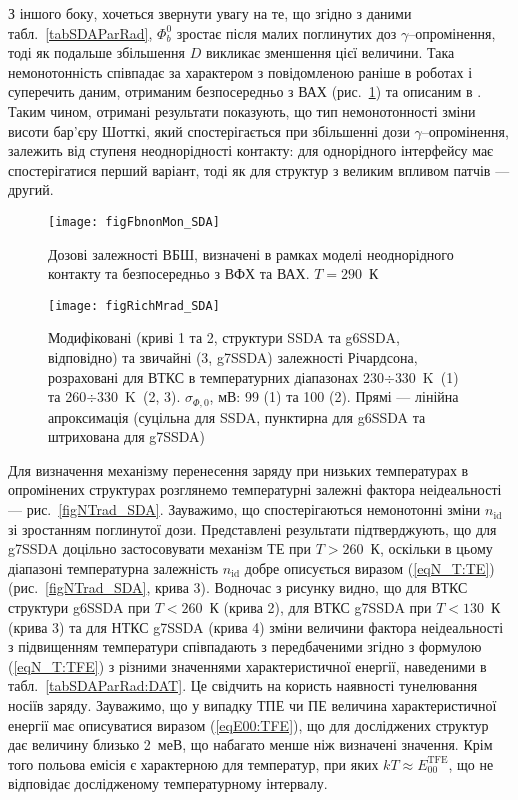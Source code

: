 З іншого боку, хочеться звернути увагу на те, що згідно з даними табл.~\ref{tabSDAParRad},
$\Phi_b^0$ зростає після малих поглинутих доз $\gamma$--опромінення, тоді як подальше збільшення $D$ викликає зменшення
цієї величини.
Така немонотонність співпадає за характером з повідомленою раніше в роботах \cite{Karatas:2006NIMA, Vorobets, Pattabi} і суперечить
даним, отриманим безпосередньо з ВАХ (рис.~\ref{figFbnonMon_SDA})  та описаним в \cite{Umana,Verma}.
Таким чином, отримані результати показують, що тип немонотонності зміни висоти бар'єру Шотткі, який спостерігається
при збільшенні дози $\gamma$--опромінення,
залежить від ступеня неоднорідності контакту:
для однорідного інтерфейсу має спостерігатися перший варіант,
тоді як для структур з великим впливом патчів --- другий.

\begin{figure}
\center
\texttt{[image: figFbnonMon\_SDA]}
\caption{\label{figFbnonMon_SDA}
Дозові залежності ВБШ, визначені в рамках моделі неоднорідного контакту та безпосередньо з ВФХ та ВАХ.
$T=290$~К
}%
\end{figure}

\begin{figure}
\center
\texttt{[image: figRichMrad\_SDA]}
\caption{\label{figRichMrad_SDA}
Модифіковані (криві 1 та 2, структури SSDA та g6SSDA, відповідно) та звичайні (3, g7SSDA) залежності Річардсона, розраховані для ВТКС в
температурних діапазонах 230$\div$330~K~(1) та 260$\div$330~K~(2, 3).
$\sigma_{\Phi,0}$, мВ: 99 (1) та 100 (2).
Прямі  --- лінійна апроксимація (суцільна для SSDA, пунктирна для g6SSDA та
штрихована для g7SSDA)
}%
\end{figure}

Для визначення механізму перенесення заряду при низьких температурах
в опромінених структурах розглянемо температурні залежні фактора неідеальності --- рис.~\ref{figNTrad_SDA}.
Зауважимо, що спостерігаються немонотонні зміни $n_\mathrm{id}$ зі зростанням поглинутої дози.
Представлені результати підтверджують, що для g7SSDA доцільно застосовувати механізм ТЕ при $T>260$~К,
оскільки в цьому діапазоні температурна залежність $n_\mathrm{id}$ добре описується виразом (\ref{eqN_T:TE})  (рис.~\ref{figNTrad_SDA}, крива 3).
Водночас з рисунку видно, що для ВТКС структури g6SSDA при $T<260$~К (крива 2), для ВТКС g7SSDA при $T<130$~К (крива 3) та для НТКС g7SSDA (крива 4)
зміни величини фактора неідеальності з підвищенням температури співпадають з передбаченими згідно з формулою (\ref{eqN_T:TFE}) з різними значеннями характеристичної
енергії, наведеними в табл.~\ref{tabSDAParRad:DAT}.
Це свідчить на користь наявності тунелювання носіїв заряду.
Зауважимо, що у випадку ТПЕ чи ПЕ величина характеристичної енергії має описуватися
виразом (\ref{eqE00:TFE}),
що для досліджених структур дає величину близько 2~меВ, що набагато менше ніж визначені значення.
Крім того польова емісія є характерною для температур, при яких $kT\approx E_{00}^\mathrm{TFE}$, що не відповідає дослідженому температурному
інтервалу.



